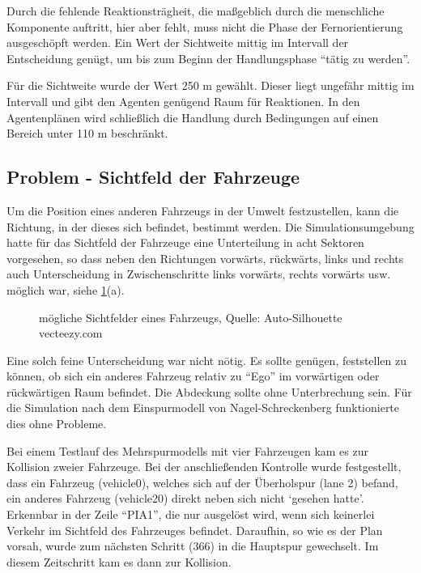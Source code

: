 Durch die fehlende Reaktionsträgheit, die maßgeblich durch die menschliche Komponente auftritt, hier aber fehlt, muss nicht die Phase der Fernorientierung ausgeschöpft werden. 
Ein Wert der Sichtweite mittig im Intervall der Entscheidung genügt, um bis zum Beginn der Handlungsphase \enquote{tätig zu werden}.

Für die Sichtweite wurde der Wert 250 m gewählt.
Dieser liegt ungefähr mittig im Intervall und gibt den Agenten genügend Raum für Reaktionen. 
In den Agentenplänen wird schließlich die Handlung durch Bedingungen auf einen Bereich unter 110 m beschränkt.



\subsection{Problem - Sichtfeld der Fahrzeuge}

Um die Position eines anderen Fahrzeugs in der Umwelt festzustellen, kann die Richtung, in der dieses sich befindet, bestimmt werden.
Die Simulationsumgebung hatte für das Sichtfeld der Fahrzeuge eine Unterteilung in acht Sektoren vorgesehen, so dass neben den Richtungen vorwärts, rückwärts, links und rechts auch Unterscheidung in Zwischenschritte links vorwärts, rechts vorwärts usw. möglich war, siehe \cref{figure:car-view-sectors}(a).

\begin{figure}[hptb]
  \centering 
   \qquad 
   \qquad 
  \caption{mögliche Sichtfelder eines Fahrzeugs, Quelle: Auto-Silhouette vecteezy.com} 
  \label{figure:car-view-sectors}
\end{figure}

Eine solch feine Unterscheidung war nicht nötig.
Es sollte genügen, feststellen zu können, ob sich ein anderes Fahrzeug relativ zu \enquote{Ego} im vorwärtigen oder rückwärtigen Raum befindet. 
Die Abdeckung sollte ohne Unterbrechung sein.
Für die Simulation nach dem Einspurmodell von Nagel-Schreckenberg funktionierte dies ohne Probleme.

Bei einem Testlauf des Mehrspurmodells mit vier Fahrzeugen kam es zur Kollision zweier Fahrzeuge. 
Bei der anschließenden Kontrolle wurde festgestellt, dass ein Fahrzeug (vehicle0), welches sich auf der Überholspur (lane 2) befand, ein anderes Fahrzeug (vehicle20) direkt neben sich nicht \enquote*{gesehen hatte}. 
Erkennbar in der Zeile \enquote{PIA1}, die nur ausgelöst wird, wenn sich keinerlei Verkehr im Sichtfeld des Fahrzeuges befindet.
Daraufhin, so wie es der Plan vorsah, wurde zum nächsten Schritt (366) in die Hauptspur gewechselt. 
Im diesem Zeitschritt kam es dann zur Kollision.

